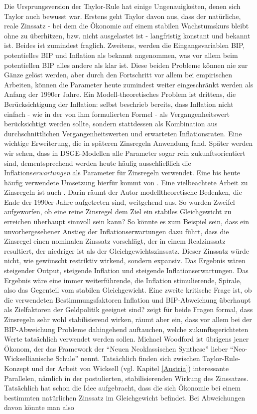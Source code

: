 Die Ursprungsversion der Taylor-Rule hat einige Ungenauigkeiten, denen sich Taylor auch bewusst war. Erstens geht Taylor davon aus, dass der natürliche, reale Zinssatz - bei dem die Ökonomie auf einem stabilen Wachstumskurs bleibt ohne zu überhitzen, bzw. nicht ausgelastet ist - langfristig konstant und bekannt ist. Beides ist zumindest fraglich. Zweitens, werden die Eingangsvariablen BIP, potentielles BIP und Inflation als bekannt angenommen, was vor allem beim potentiellen BIP alles andere als klar ist. Diese beiden Probleme können nie zur Gänze gelöst werden, aber durch den Fortschritt vor allem bei empirischen Arbeiten, können die Parameter heute zumindest weiter eingeschränkt werden als Anfang der 1990er Jahre. Ein Modell-theoretisches Problem ist drittens, die Berücksichtigung der Inflation: \textcite[S. 211]{Taylor1993} selbst beschrieb bereits, dass Inflation nicht einfach - wie in der von ihm formulierten Formel - als Vergangenheitswert berücksichtigt werden sollte, sondern stattdessen als Kombination aus durchschnittlichen Vergangenheitswerten und erwarteten Inflationsraten. Eine wichtige Erweiterung, die in späteren Zinsregeln Anwendung fand. Später werden wir sehen, dass in DSGE-Modellen alle Parameter sogar rein zukunftsorientiert sind, dementsprechend werden heute häufig ausschließlich die Inflations\textit{erwartungen} als Parameter für Zinsregeln verwendet. Eine bis heute häufig verwendete Umsetzung hierfür kommt von \textcite[S. 150ff]{Gali2000}. Eine vielbeachtete Arbeit zu Zinsregeln ist auch \textcite{Woodford2001}. Darin räumt der Autor modelltheoretische Bedenken, die Ende der 1990er Jahre aufgetreten sind, weitgehend aus. So wurden Zweifel aufgeworfen, ob eine reine Zinsregel dem Ziel ein stabiles Gleichgewicht zu erreichen überhaupt sinnvoll sein kann? So könnte es zum Beispiel sein, dass ein unvorhergesehener Anstieg der Inflationserwartungen dazu führt, dass die Zinsregel einen nominalen Zinssatz vorschlägt, der in einem  Realzinssatz resultiert, der niedriger ist als der Gleichgewichtszinssatz. Dieser Zinssatz würde nicht, wie gewünscht restriktiv wirkend, sondern expansiv. Das Ergebnis wären steigender Output, steigende Inflation und steigende Inflationserwartungen. Das Ergebnis wäre eine immer weiterführende, die Inflation stimulierende, Spirale, also das Gegenteil vom stabilen Gleichgewicht. Eine zweite kritische Frage ist, ob die verwendeten Bestimmungsfaktoren Inflation und BIP-Abweichung überhaupt als Zielfaktoren der Geldpolitik geeignet sind? \textcite{Woodford1999} zeigt für beide Fragen formal, dass Zinsregeln sehr wohl stabilisierend wirken, räumt aber ein, dass vor allem bei der BIP-Abweichung Probleme dahingehend auftauchen, welche zukunftsgerichteten Werte tatsächlich verwendet werden sollen. Michael Woodford ist übrigens jener Ökonom, der das Framework der "`Neuen Neoklassischen Synthese"' lieber "`Neo-Wicksellianische Schule"' nennt. Tatsächlich finden sich zwischen Taylor-Rule-Konzept und der Arbeit von Wicksell (vgl. Kapitel \ref{Austria}) interessante Parallelen, nämlich in der postulierten, stabilisierenden Wirkung des Zinssatzes. Tatsächlich hat schon \textcite{Wicksel1898} die Idee aufgebracht, dass die sich Ökonomie bei einem bestimmten natürlichen Zinssatz im Gleichgewicht befindet. Bei Abweichungen davon könnte man also 